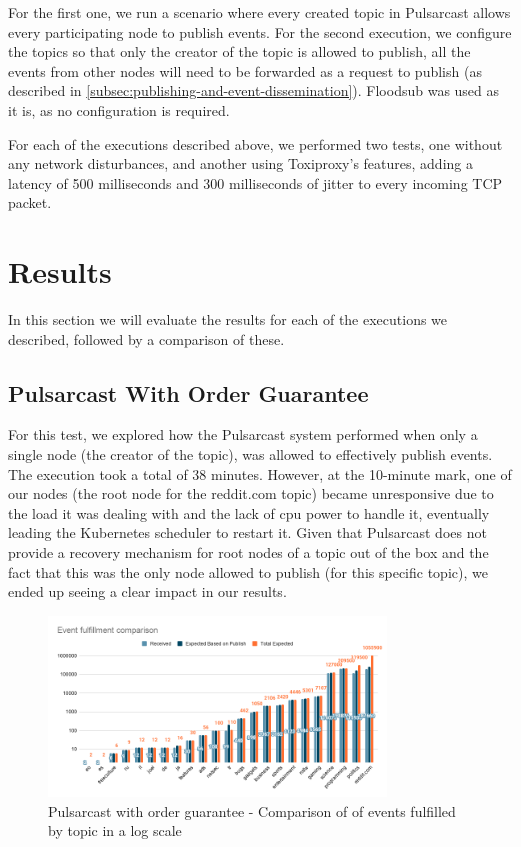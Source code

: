 For the first one, we run a scenario where every created topic in Pulsarcast
allows every participating node to publish events. For the second execution, we
configure the topics so that only the creator of the topic is allowed to
publish, all the events from other nodes will need to be forwarded as a request
to publish (as described in \ref{subsec:publishing-and-event-dissemination}).
Floodsub was used as it is, as no configuration is required. 

For each of the executions described above, we performed two tests, one without
any network disturbances, and another using Toxiproxy's features, adding a
latency of 500 milliseconds and 300 milliseconds of jitter to every incoming
TCP packet. 

\section{Results}\label{results}

In this section we will evaluate the results for each of the executions we
described, followed by a comparison of these.

\subsection{Pulsarcast With Order Guarantee}\label{subsec:pulsarcast-with-order-guarantee}

For this test, we explored how the Pulsarcast system performed when only a
single node (the creator of the topic), was allowed to effectively publish
events. The execution took a total of 38 minutes. However, at the 10-minute
mark, one of our nodes (the root node for the reddit.com topic) became
unresponsive due to the load it was dealing with and the lack of \acrshort{cpu} power to
handle it, eventually leading the Kubernetes scheduler to restart it.  Given
that Pulsarcast does not provide a recovery mechanism for root nodes of a topic
out of the box and the fact that this was the only node allowed to publish (for
this specific topic), we ended up seeing a clear impact in our results.

\begin{figure}[!htb]
  \centering
  \includegraphics[width=0.8\textwidth]{img/graph-pulsarcast-order-event-fulfillment-comparison.png}
  \caption{Pulsarcast with order guarantee - Comparison of of events fulfilled by topic in a log scale}
  \label{fig:graph-pulsarcast-order-event-fulfillment-comparison}
\end{figure}

